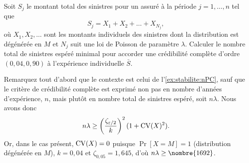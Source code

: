 \begin{exercice}
  Soit $S_j$ le montant total des sinistres pour un assuré à la
  période $j = 1, \dots, n$ tel que
  \begin{equation*}
    S_j = X_1 + X_2 + \dots + X_{N_j},
  \end{equation*}
  où $X_1, X_2, \dots$ sont les montants individuels des sinistres
  dont la distribution est dégénérée en $M$ et $N_j$ suit une loi de
  Poisson de paramètre $\lambda$. Calculer le nombre total de
  sinistres espéré minimal pour accorder une crédibilité complète
  d'ordre $(0,04, 0,90)$ à l'expérience individuelle $\bar{S}$.
  \begin{rep}
  \end{rep}
  \begin{sol}
    Remarquez tout d'abord que le contexte est celui de
    l'\autoref{ex:stabilite:nPC}, sauf que le critère de crédibilité
    complète est exprimé non pas en nombre d'années d'expérience, $n$,
    mais plutôt en nombre total de sinistres espéré, soit $n \lambda$.
    Nous avons donc
    \begin{equation*}
      n \lambda \geq
      \left(
        \frac{\zeta_{\varepsilon/2}}{k}
      \right)^2
      (1 + \operatorname{CV}(X)^2).
    \end{equation*}
    Or, dans le cas présent, $\operatorname{CV}(X) = 0$ puisque $\Pr[X = M]
    = 1$ (distribution dégénérée en $M$), $k = 0,04$ et $\zeta_{0,05}
    = 1,645$, d'où $n \lambda \geq \nombre{1692}$.
  \end{sol}
\end{exercice}

